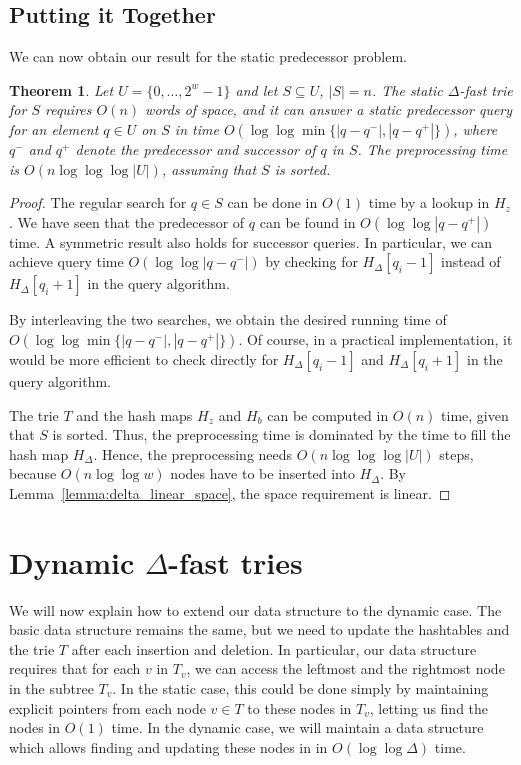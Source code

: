 \documentclass[a4paper,11pt]{article}
\newtheorem{theorem} {Theorem}[section]
\newcommand{\?}{\mskip1.5mu}
\begin{document}
\subsection{Putting it Together}

We can now obtain our result for the static predecessor problem.

\begin{theorem}\label{thm:staticresult}
Let $U = \{0, \dots, 2^{w}-1\}$ and let
$S \subseteq U$, $|S| = n$.
The static $\Delta$-fast trie for $S$ requires
$O(n)$ words of space, and it can answer
a static predecessor query for an element $q \in U$ on $S$ in time
$O(\log \log \min\{|q-q^-|, |q-q^+|\})$,
where $q^-$ and $q^+$ denote the predecessor
and successor of $q$ in $S$.
The preprocessing time is 
$O(n \log\log \log |U|)$, assuming that
$S$ is sorted.
\end{theorem}

\begin{proof}
The regular search for $q \in S$ can be done in 
$O(1)$ time by a lookup in $H_z$. 
We have seen that the predecessor of $q$
can be found in $O(\log \log |q-q^+|)$ time.
A symmetric result also holds for 
successor queries.
In particular, we can achieve query time 
$O(\log \log |q-q^-|)$  by checking for
$H_\Delta[q_i-1]$ instead of $H_\Delta[q_i+1]$ in the 
query algorithm. 

By interleaving the two searches,
we obtain the desired running time of 
$O(\log\log \min\{|q - q^-|, |q - q^+|\})$. 
Of course, in a practical implementation, it would be 
more efficient to check directly for $H_\Delta[q_i-1]$
and $H_\Delta[q_i+1]$ in the query algorithm.

The trie $T$ and the hash maps $H_z$
and $H_b$ can be computed in $O(n)$ time, given that
$S$ is sorted.
Thus, the preprocessing time is dominated by the time to fill the 
hash map $H_\Delta$.  Hence, the preprocessing needs
$O(n\log\log\log |U|)$ steps, because $O(n\log\log w)$ nodes 
have to be
inserted into $H_\Delta$. 
By Lemma~\ref{lemma:delta_linear_space}, the space requirement
is linear.
\end{proof}

\section{Dynamic $\Delta$-fast tries}

We will now explain how to extend our data
structure to the dynamic case. 
The basic data structure remains the same, but
we need to update the hashtables and the trie $T$
after each insertion and deletion.
In particular, our data structure requires that
for each $v$ in $T_v$, we can access the 
leftmost and the rightmost node
in the subtree $T_v$.
In the static case, this could be done simply
by maintaining explicit pointers from each node
$v \in T$ to these nodes in $T_v$, letting us find
the nodes in $O(1)$ time.
In the dynamic case, we will maintain a data structure
which allows finding and updating these nodes in
in $O(\log\log \Delta)$ time.
\end{document}
